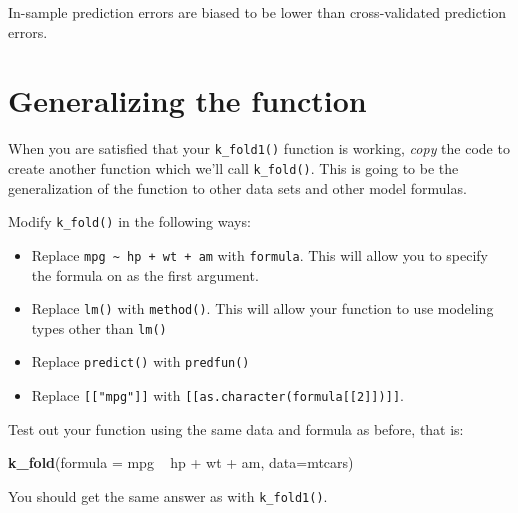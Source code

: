 \documentclass[]{tufte-handout}
\newenvironment{Shaded}{}{}
\newcommand{\KeywordTok}[1]{\textcolor[rgb]{0.00,0.44,0.13}{\textbf{{#1}}}}
\newcommand{\DataTypeTok}[1]{\textcolor[rgb]{0.56,0.13,0.00}{{#1}}}
\newcommand{\StringTok}[1]{\textcolor[rgb]{0.25,0.44,0.63}{{#1}}}
\newcommand{\NormalTok}[1]{{#1}}
\providecommand{\tightlist}{%
  \setlength{\itemsep}{0pt}\setlength{\parskip}{0pt}}
\begin{document}
In-sample prediction errors are biased to be lower than cross-validated
prediction errors.

\section{Generalizing the function}\label{generalizing-the-function}

When you are satisfied that your \texttt{k\_fold1()} function is
working, \emph{copy} the code to create another function which we'll
call \texttt{k\_fold()}. This is going to be the generalization of the
function to other data sets and other model formulas.

Modify \texttt{k\_fold()} in the following ways:

\begin{itemize}
\tightlist
\item
  Replace \texttt{mpg\ \textasciitilde{}\ hp\ +\ wt\ +\ am} with
  \texttt{formula}. This will allow you to specify the formula on as the
  first argument.
\item
  Replace \texttt{lm()} with \texttt{method()}. This will allow your
  function to use modeling types other than \texttt{lm()}
\item
  Replace \texttt{predict()} with \texttt{predfun()}
\item
  Replace \texttt{{[}{[}"mpg"{]}{]}} with
  \texttt{{[}{[}as.character(formula{[}{[}2{]}{]}){]}{]}}.
\end{itemize}

Test out your function using the same data and formula as before, that
is:

\begin{Shaded}
\begin{Highlighting}[]
\KeywordTok{k_fold}\NormalTok{(}\DataTypeTok{formula =} \NormalTok{mpg ~}\StringTok{ }\NormalTok{hp +}\StringTok{ }\NormalTok{wt +}\StringTok{ }\NormalTok{am, }\DataTypeTok{data=}\NormalTok{mtcars)}
\end{Highlighting}
\end{Shaded}

You should get the same answer as with \texttt{k\_fold1()}.
\end{document}
